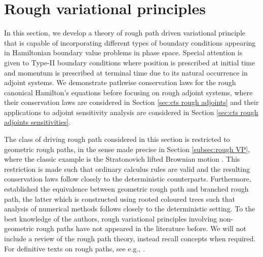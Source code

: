 \documentclass[11pt, oneside]{article}
\numberwithin{equation}{section}
\theoremstyle{definition}
\begin{document}
\section{Rough variational principles}\label{sec:rough VP}
In this section, we develop a theory of rough path driven variational principle that is capable of incorporating different types of boundary conditions appearing in Hamiltonian boundary value problems in phase space. 
Special attention is given to Type-II boundary conditions where position is prescribed at initial time and momentum is prescribed at terminal time due to its natural occurrence in adjoint systems. We demonstrate pathwise conservation laws for the rough canonical Hamilton's equations before focusing on rough adjoint systems, where their conservation laws are considered in Section \ref{sec:cts rough adjoints} and their applications to adjoint sensitivity analysis are considered in Section \ref{sec:cts rough adjoints sensitivities}. 

The class of driving rough path considered in this section is restricted to geometric rough paths, in the sense made precise in Section \ref{subsec:rough VP}, where the classic example is the Stratonovich lifted Brownian motion \cite[Sec. 3.3]{FH2020}. This restriction is made such that ordinary calculus rules are valid and the resulting conservation laws follow closely to the deterministic counterparts. Furthermore, \cite{HK2015} established the equivalence between geometric rough path and branched rough path, the latter which is constructed using rooted coloured trees such that analysis of numerical methods follows closely to the deterministic setting. To the best knowledge of the authors, rough variational principles involving non-geometric rough paths have not appeared in the literature before. We will not include a review of the rough path theory, instead recall concepts when required. For definitive texts on rough paths, see e.g., \cite{FH2020, FV10, LCL2007}. 
\end{document}
